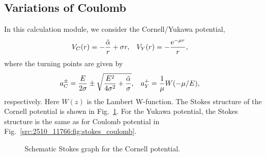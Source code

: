 \subsection{Variations of Coulomb}\label{src:2510_11766:sec:cornell_yukawa}
In this calculation module, we consider the Cornell/Yukawa potential,
\begin{align}
    V_C(r) &= - \frac{\Tilde\alpha}{r} + \sigma r, &
    V_Y(r) &= - \frac{\mathrm{e}^{-\mu r}}{r} ,
\end{align}
where the turning points are given by
\begin{align}
    a_C^\pm &= \frac{E}{2\sigma} \pm \sqrt{\frac{E^2}{4\sigma^2} + \frac{\Tilde\alpha}{\sigma}}, &
    a_Y^+ &= \frac{1}{\mu} W(-\mu/E) ,
\end{align}
respectively.
Here $W(z)$ is the Lambert W-function.
The Stokes structure of the Cornell potential is shown in Fig.~\ref{src:2510_11766:fig:stokes_cornell}. For the Yukawa potential, the Stokes structure is the same as for Coulomb potential in Fig.~\ref{src:2510_11766:fig:stokes_coulomb}.
\begin{figure}[t]
\centering
{}
\caption{Schematic Stokes graph for the Cornell potential.}
\label{src:2510_11766:fig:stokes_cornell}
\end{figure}
